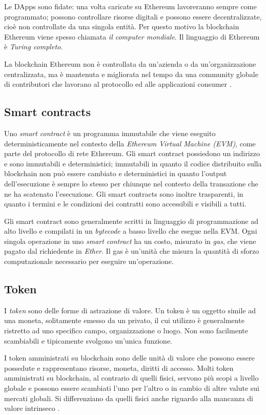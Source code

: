 Le DApps sono fidate: una volta caricate su Ethereum lavoreranno sempre come programmato; possono controllare risorse digitali e possono essere decentralizzate, cioè non controllate da una singola entità. Per questo motivo la blockchain Ethereum viene spesso chiamata \emph{il computer mondiale}. Il linguaggio di Ethereum è \emph{Turing completo}.

La blockchain Ethereum non è controllata da un'azienda o da un'organizzazione centralizzata, ma è mantenuta e migliorata nel tempo da una community globale di contributori che lavorano al protocollo ed alle applicazioni consumer \cite{ethereum-org}.

\subsection{Smart contracts}
\label{smart-contracts}
Uno \emph{smart contract} è un programma immutabile che viene eseguito deterministicamente nel contesto della \emph{Ethereum Virtual Machine (EVM)}, come parte del protocollo di rete Ethereum. Gli smart contract possiedono un indirizzo e sono immutabili e deterministici; immutabili in quanto il codice distribuito sulla blockchain non può essere cambiato e deterministici in quanto l'output dell'esecuzione è sempre lo stesso per chiunque nel contesto della transazione che ne ha scatenato l'esecuzione. Gli smart contracts sono inoltre trasparenti, in quanto i termini e le condizioni dei contratti sono accessibili e visibili a tutti.

Gli smart contract sono generalmente scritti in linguaggio di programmazione ad alto livello e compilati in un \emph{bytecode} a basso livello che esegue nella EVM. Ogni singola operazione in uno \emph{smart contract} ha un costo, misurato in \emph{gas}, che viene pagato dal richiedente in \emph{Ether}. Il gas è un'unità che misura la quantità di sforzo computazionale necessario per eseguire un'operazione.

\subsection{Token}
\label{token}
I \emph{token} sono delle forme di astrazione di valore. Un token è un oggetto simile ad una moneta, solitamente emesso da un privato, il cui utilizzo è generalmente ristretto ad uno specifico campo, organizzazione o luogo. Non sono facilmente scambiabili e tipicamente svolgono un'unica funzione.

I token amministrati su blockchain sono delle unità di valore che possono essere possedute e rappresentano risorse, moneta, diritti di accesso. Molti token amministrati su blockchain, al contrario di quelli fisici, servono più scopi a livello globale e possono essere scambiati l'uno per l'altro o in cambio di altre valute sui mercati globali. Si differenziano da quelli fisici anche riguardo alla mancanza di valore intrinseco \cite{token}.

